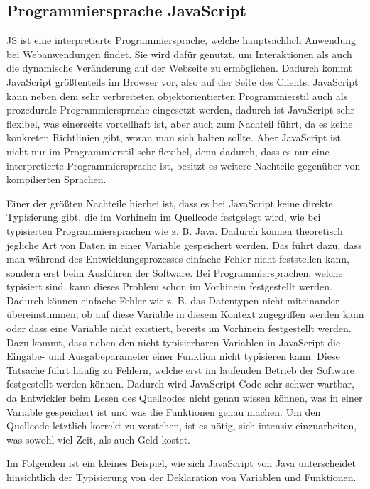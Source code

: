 \subsection{Programmiersprache JavaScript}
\label{chapter:3-javaScript}

\acl{JS} ist eine interpretierte Programmiersprache, welche hauptsächlich Anwendung bei Webanwendungen findet. Sie wird dafür genutzt, um Interaktionen als auch die dynamische Veränderung auf der Webseite zu ermöglichen. Dadurch kommt JavaScript größtenteils im Browser vor, also auf der Seite des Clients. JavaScript kann neben dem sehr verbreiteten objektorientierten Programmierstil auch als prozedurale Programmiersprache eingesetzt werden, dadurch ist JavaScript sehr flexibel, was einerseits vorteilhaft ist, aber auch zum Nachteil führt, da es keine konkreten Richtlinien gibt, woran man sich halten sollte. Aber JavaScript ist nicht nur im Programmierstil sehr flexibel, denn dadurch, dass es nur eine interpretierte Programmiersprache ist, besitzt es weitere Nachteile gegenüber von kompilierten Sprachen.

Einer der größten Nachteile hierbei ist, dass es bei JavaScript keine direkte Typisierung gibt, die im Vorhinein im Quellcode festgelegt wird, wie bei typisierten Programmiersprachen wie z. B. Java. Dadurch können theoretisch jegliche Art von Daten in einer Variable gespeichert werden. Das führt dazu, dass man während des Entwicklungsprozesses einfache Fehler nicht feststellen kann, sondern erst beim Ausführen der Software.
Bei Programmiersprachen, welche typisiert sind, kann dieses Problem schon im Vorhinein festgestellt werden. Dadurch können einfache Fehler wie z. B. das Datentypen nicht miteinander übereinstimmen, ob auf diese Variable in diesem Kontext zugegriffen werden kann oder dass eine Variable nicht existiert, bereits im Vorhinein festgestellt werden. Dazu kommt, dass neben den nicht typisierbaren Variablen in JavaScript die Eingabe- und Ausgabeparameter einer Funktion nicht typisieren kann. Diese Tatsache führt häufig zu Fehlern, welche erst im laufenden Betrieb der Software festgestellt werden können. Dadurch wird JavaScript-Code sehr schwer wartbar, da Entwickler beim Lesen des Quellcodes nicht genau wissen können, was in einer Variable gespeichert ist und was die Funktionen genau machen. Um den Quellcode letztlich korrekt zu verstehen, ist es nötig, sich intensiv einzuarbeiten, was sowohl viel Zeit, als auch Geld kostet.

Im Folgenden ist ein kleines Beispiel, wie sich JavaScript von Java unterscheidet hinsichtlich der Typisierung von der Deklaration von Variablen und Funktionen.

